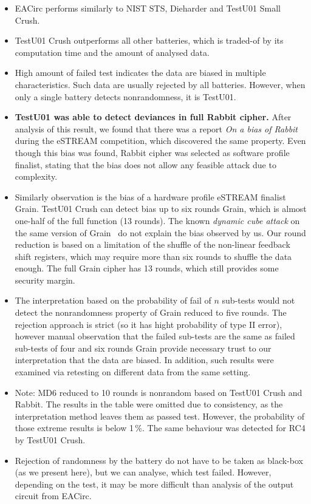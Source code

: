 \documentclass[
  print, %
  Table,   %
  nolof,     %
  nolot,     %
  11pt, %
  oneside  %
]{fithesis3}
\begin{document}
\begin{itemize}
    \item EACirc performs similarly to NIST STS, Dieharder and TestU01 Small Crush.
    \item TestU01 Crush outperforms all other batteries, which is traded-of by its computation time and the amount of analysed data.
    \item High amount of failed test indicates the data are biased in multiple characteristics. Such data are usually rejected by all batteries. However, when only a single battery detects nonrandomness, it is TestU01.
    \item \textbf{TestU01 was able to detect deviances in full Rabbit cipher.} After analysis of this result, we found that there was a report \textit{On a bias of Rabbit}~\cite{aumasson2007bias} during the eSTREAM competition, which discovered the same property. Even though this bias was found, Rabbit cipher was selected as software profile finalist, stating that the bias does not allow any feasible attack due to complexity.
    \item Similarly observation is the bias of a hardware profile eSTREAM finalist Grain. TestU01 Crush can detect bias up to six rounds Grain, which is almost one-half of the full function (13 rounds). The known \textit{dynamic cube attack} on the same version of Grain~\cite{dinur2011breaking} do not explain the bias observed by us. Our round reduction is based on a limitation of the shuffle of the non-linear feedback shift registers, which may require more than six rounds to shuffle the data enough. The full Grain cipher has 13 rounds, which still provides some security margin.
    \item The interpretation based on the probability of fail of $n$ sub-tests would not detect the nonrandomness property of Grain reduced to five rounds. The rejection approach is strict (so it has hight probability of type II error), however manual observation that the failed sub-tests are the same as failed sub-tests of four and six rounds Grain provide necessary trust to our interpretation that the data are biased. In addition, such results were examined via retesting on different data from the same setting.
    \item Note: MD6 reduced to 10 rounds is nonrandom based on TestU01 Crush and Rabbit. The results in the table were omitted due to consistency, as the interpretation method leaves them as passed test. However, the probability of those extreme results is below 1\,\%. The same behaviour was detected for RC4 by TestU01 Crush.
    \item Rejection of randomness by the battery do not have to be taken as black-box (as we present here), but we can analyse, which test failed. However, depending on the test, it may be more difficult than analysis of the output circuit from EACirc.


\end{itemize}
\end{document}
